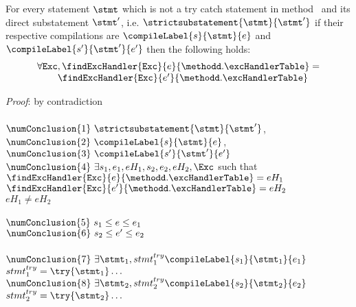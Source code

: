 \begin{compProp8A}
  For every statement $\stmt$ which is not a try catch statement  in method \methodd \  and  its direct substatement $\stmt'$, i.e. 
$\strictsubstatement{\stmt}{\stmt'} $
if their respective compilations are  $\compileLabel{s}{\stmt}{e}$ and  $\compileLabel{s'}{\stmt'}{e'}$ then the following holds:
$$ \begin{array}{l}
          \forall \mbox{\rm\tt{Exc}}, \findExcHandler{\mbox{\rm\tt{Exc}} }{e}{\methodd.\excHandlerTable} = \\
	  \phantom{\forall \mbox{\rm\tt{Exc}} }\findExcHandler{\mbox{\rm\tt{Exc}} }{e'}{\methodd.\excHandlerTable} 
   \end{array}
$$
\end{compProp8A}
\textit{Proof}: by contradiction \\
 \\
$\numConclusion{1} \ \strictsubstatement{\stmt}{\stmt'}   $, \\
$\numConclusion{2} \ \compileLabel{s}{\stmt}{e}$,\\
$\numConclusion{3} \ \compileLabel{s'}{\stmt'}{e'}$ \\
$\numConclusion{4} \ \exists s_1, e_1, eH_1, s_2, e_2, eH_2, \Exc $ such that\\
   $\findExcHandler{\mbox{\rm\tt{Exc}} }{e}{\methodd.\excHandlerTable} = eH_1$  \\
   $\findExcHandler{\mbox{\rm\tt{Exc}} }{e'}{\methodd.\excHandlerTable} = eH_2$  \\
   $ eH_1 \neq  eH_2  $ \\
 \\
$\numConclusion{5} \  s_1 \le e \le e_1$ \\
$\numConclusion{6} \  s_2 \le e' \le e_2$ \\
 \\
$\numConclusion{7} \ \exists \stmt_1, stmt^{try}_1  \compileLabel{s_1}{\stmt_1}{e_1}$ $  stmt^{try}_1 = \try\{ \stmt_1\} \ldots $ \\
$\numConclusion{8} \ \exists \stmt_2,stmt^{try}_2 \compileLabel{s_2}{\stmt_2}{e_2} $ $ stmt^{try}_2 = \try\{ \stmt_2\} \ldots $ \\
 \\
